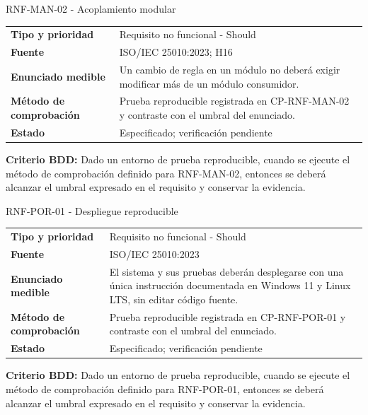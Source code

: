 \begin{reqbox}[colframe=Teal]{RNF-MAN-02 - Acoplamiento modular}
\begin{tabularx}{\textwidth}{>{\bfseries}p{3.2cm}Y}
Tipo y prioridad & Requisito no funcional - Should \\
Fuente & ISO/IEC 25010:2023; H16 \\
Enunciado medible & Un cambio de regla en un módulo no deberá exigir modificar más de un módulo consumidor. \\
Método de comprobación & Prueba reproducible registrada en CP-RNF-MAN-02 y contraste con el umbral del enunciado. \\
Estado & Especificado; verificación pendiente \\
\end{tabularx}
\textbf{Criterio BDD:} Dado un entorno de prueba reproducible, cuando se ejecute el método de comprobación definido para RNF-MAN-02, entonces se deberá alcanzar el umbral expresado en el requisito y conservar la evidencia.
\end{reqbox}


\begin{reqbox}[colframe=Teal]{RNF-POR-01 - Despliegue reproducible}
\begin{tabularx}{\textwidth}{>{\bfseries}p{3.2cm}Y}
Tipo y prioridad & Requisito no funcional - Should \\
Fuente & ISO/IEC 25010:2023 \\
Enunciado medible & El sistema y sus pruebas deberán desplegarse con una única instrucción documentada en Windows 11 y Linux LTS, sin editar código fuente. \\
Método de comprobación & Prueba reproducible registrada en CP-RNF-POR-01 y contraste con el umbral del enunciado. \\
Estado & Especificado; verificación pendiente \\
\end{tabularx}
\textbf{Criterio BDD:} Dado un entorno de prueba reproducible, cuando se ejecute el método de comprobación definido para RNF-POR-01, entonces se deberá alcanzar el umbral expresado en el requisito y conservar la evidencia.
\end{reqbox}


